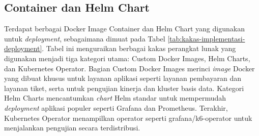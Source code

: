 \subsection{Container dan Helm Chart}

Terdapat berbagai Docker Image Container dan Helm Chart yang digunakan untuk \textit{deployment}, sebagaimana dimuat pada Tabel \ref{tab:kakas-implementasi-deployment}. Tabel ini menguraikan berbagai kakas perangkat lunak yang digunakan menjadi tiga kategori utama: Custom Docker Images, Helm Charts, dan Kubernetes Operator. Bagian Custom Docker Images merinci \textit{image} Docker yang dibuat khusus untuk layanan aplikasi seperti layanan pembayaran dan layanan tiket, serta untuk pengujian kinerja dan kluster basis data. Kategori Helm Charts mencantumkan \textit{chart} Helm standar untuk mempermudah \textit{deployment} aplikasi populer seperti Grafana dan Prometheus. Terakhir, Kubernetes Operator menampilkan operator seperti grafana/k6-operator untuk menjalankan pengujian secara terdistribusi.

\pagebreak

